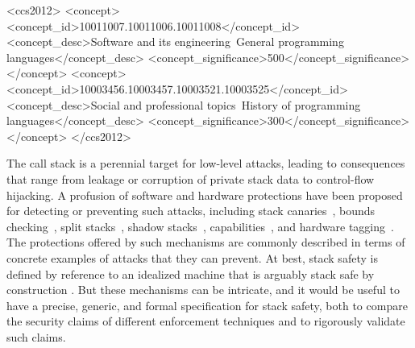 \documentclass[acmtog,review,anonymous]{acmart}\settopmatter{printfolios=true,printccs=false,printacmref=false}
\begin{document}


\begin{CCSXML}
<ccs2012>
<concept>
<concept_id>10011007.10011006.10011008</concept_id>
<concept_desc>Software and its engineering~General programming languages</concept_desc>
<concept_significance>500</concept_significance>
</concept>
<concept>
<concept_id>10003456.10003457.10003521.10003525</concept_id>
<concept_desc>Social and professional topics~History of programming languages</concept_desc>
<concept_significance>300</concept_significance>
</concept>
</ccs2012>
\end{CCSXML}



\ifcameraready
{}  %
\fi


\maketitle


The call stack is a perennial target for low-level attacks, leading to
consequences that range from leakage or corruption of private stack data to
control-flow hijacking. A profusion of
software and hardware protections have been proposed for detecting or
preventing such attacks,
%
including stack canaries~\citep{Cowan+98},
bounds checking~\citep{NagarakatteZMZ09,NagarakatteZMZ10,DeviettiBMZ08},
split stacks~\citep{Kuznetsov+14},
shadow stacks~\citep{Dang+15,Shanbhogue+19},
capabilities~\citep{Woodruff+14,Chisnall+15,SkorstengaardLocal,SkorstengaardSTK,Georges+21},
and hardware tagging~\citep{DBLP:conf/sp/RoesslerD18}.
%
The protections offered by such mechanisms are commonly described in terms
of concrete examples of attacks that they can prevent.
At best, stack safety is defined by reference to an idealized machine that
is arguably stack safe by construction \citep{SkorstengaardSTK}.
But these mechanisms can be intricate, and it would be useful to have a precise, generic, and formal
specification for stack safety, both to compare the security claims of different
enforcement techniques and to rigorously validate such claims.
\end{document}

